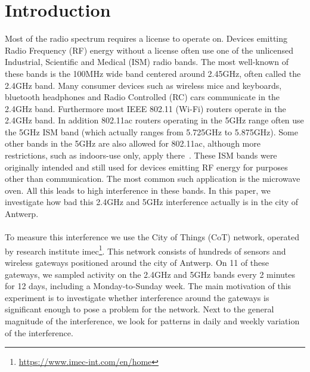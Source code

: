 \documentclass[a4paper, 11pt]{article}
\begin{document}
\section{Introduction}
Most of the radio spectrum requires a license to operate on. Devices emitting Radio Frequency (RF) energy without a license often use one of the unlicensed Industrial, Scientific and Medical (ISM) radio bands. The most well-known of these bands is the 100MHz wide band centered around 2.45GHz, often called the 2.4GHz band. Many consumer devices such as wireless mice and keyboards, bluetooth headphones and Radio Controlled (RC) cars communicate in the 2.4GHz band. Furthermore most IEEE 802.11 (Wi-Fi) routers operate in the 2.4GHz band. In addition 802.11ac routers operating in the 5GHz range often use the 5GHz ISM band (which actually ranges from 5.725GHz to 5.875GHz). Some other bands in the 5GHz are also allowed for 802.11ac, although more restrictions, such as indoors-use only, apply there~\cite{50ism}. These ISM bands were originally intended and still used for devices emitting RF energy for purposes other than communication. The most common such application is the microwave oven. All this leads to high interference in these bands. In this paper, we investigate how bad this 2.4GHz and 5GHz interference actually is in the city of Antwerp. \\ \\
To measure this interference we use the City of Things (CoT) network, operated by research institute imec\footnote{\url{https://www.imec-int.com/en/home}}. This network consists of hundreds of sensors and wireless gateways positioned around the city of Antwerp. On 11 of these gateways, we sampled activity on the 2.4GHz and 5GHz bands every 2 minutes for 12 days, including a Monday-to-Sunday week. The main motivation of this experiment is to investigate whether interference around the gateways is significant enough to pose a problem for the network. Next to the general magnitude of the interference, we look for patterns in daily and weekly variation of the interference.
\end{document}
